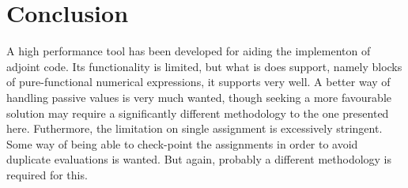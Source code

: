 \documentclass[a4paper,10pt]{article}
\begin{document}
\section{Conclusion}
A high performance tool has been developed for aiding the implementon of adjoint code. Its functionality is limited, but what is does support, namely blocks of pure-functional numerical expressions, it supports very well. A better way of handling passive values is very much wanted, though seeking a more favourable solution may require a significantly different methodology to the one presented here. Futhermore, the limitation on single assignment is excessively stringent. Some way of being able to check-point the assignments in order to avoid duplicate evaluations is wanted. But again, probably a different methodology is required for this.



\end{document}
